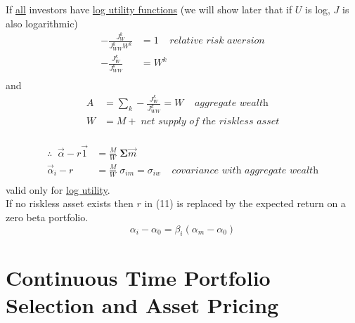 \documentclass[
14pt,notheorems,hyperref={pdfauthor=whatever}
]{beamer}
\begin{document}
\begin{frame}
If \underline{all} investors have \underline{log utility functions} (we will show later that if $U$ is log, $J$ is also logarithmic)\\
\begin{align*}
    -\frac{J_W^k}{J_{WW}^k W^k} &= 1\;\;\;\;\textit{relative risk aversion}\\
    -\frac{J_W^k}{J_{WW}^k} &= W^k\\
\end{align*}
and
\begin{align*}
    A &= \sum_k-\frac{J_W^k}{J_{WW}^k} = W\;\;\;\;\textit{aggregate wealth}\\
    W &= M + \;\textit{net supply of the riskless asset}\\
\end{align*}
\end{frame}

\begin{frame}
\begin{align*}
    \therefore \;\; \vec{\alpha}-r\vec{1} &= \frac{M}{W}\; \bm{\Sigma}\vec{m}\\
    \vec{\alpha}_i-r &= \frac{M}{W}\; \sigma_{im} = \sigma_{iw} \;\;\;\; \textit{covariance with aggregate wealth}\\
\end{align*}
valid only for \underline{log utility}.\\
\hfill\break
If no riskless asset exists then $r$ in (11) is replaced by the expected return on a zero beta portfolio.\\
\begin{equation} \tag{11'}
    \alpha_i-\alpha_0 = \beta_i (\alpha_m-\alpha_0)
\end{equation}
\end{frame}

\section{Continuous Time Portfolio Selection and Asset Pricing}
\end{document}
